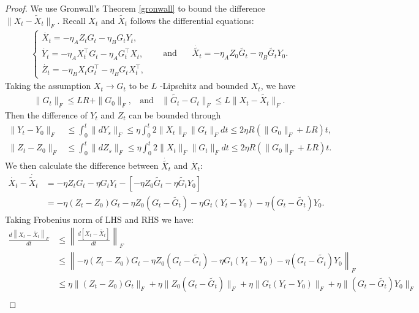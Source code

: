 \begin{proof}
    We use Gronwall's Theorem \ref{gronwall} to bound the difference $\|X_t-\tilde{X}_t\|_F$. Recall $X_t$ and $\tilde{X_t}$ follows the differential equations:
    \begin{align}
        \begin{cases}
            \dot{X_t}=-\eta_A Z_tG_t-\eta_B G_tY_t,\\
            \dot{Y_t}=-\eta_A X_t^\top G_t-\eta_A G_t^\top X_t,\\
            \dot{Z_t}=-\eta_B X_tG_t^\top -\eta_B G_tX_t^\top,
        \end{cases}
        ~~~~~~~~\text{and}~~~~~~~~
        \dot{\tilde{X_t}}=-\eta_A Z_0\tilde{G_t}-\eta_B \tilde{G_t}Y_0.
    \end{align}
    Taking the assumption $X_t\to G_t$ to be $L$ -Lipschitz and bounded $X_t$, we have 
    \begin{align}
        \|G_t\|_F\leq LR+\|G_0\|_F,~~~~\text{and}~~~~\|\tilde{G_t}-G_t\|_F\leq L\|X_t-\tilde{X_t}\|_F.
    \end{align}
    Then the difference of $Y_t$ and $Z_t$ can be bounded through
    \begin{align}
        \|Y_t-Y_0\|_F&\leq \int_0^t\|dY_s\|_F\leq \eta \int_0^t 2\|X_t\|_F\|G_t\|_Fdt\leq 2\eta R(\|G_0\|_F+LR)t,\\
        \|Z_t-Z_0\|_F&\leq \int_0^t\|dZ_s\|_F\leq \eta \int_0^t 2\|X_t\|_F\|G_t\|_Fdt\leq 2\eta R(\|G_0\|_F+LR)t.
    \end{align}
    We then calculate the difference between $\dot{\tilde{X_t}}$ and $\dot{X_t}$:
    \begin{align}
        \dot{X_t}-\dot{\tilde{X}_t}&=-\eta Z_tG_t-\eta G_tY_t-[-\eta Z_0\tilde{G_t}-\eta \tilde{G_t}Y_0]\\
        &=-\eta(Z_t-Z_0)G_t-\eta Z_0(G_t-\tilde{G_t})-\eta G_t(Y_t-Y_0)-\eta(G_t-\tilde{G_t})Y_0.
    \end{align}
    Taking Frobenius norm of LHS and RHS we have:
    \begin{align}
        \frac{d\left\|X_t-\tilde{X_t}\right\|_F}{dt}&\leq \left\|\frac{d[X_t-\tilde{X_t}]}{dt}\right\|_F\\
        &\leq \left\|-\eta(Z_t-Z_0)G_t-\eta Z_0(G_t-\tilde{G_t})-\eta G_t(Y_t-Y_0)-\eta(G_t-\tilde{G_t})Y_0\right\|_F\\
        &\leq \eta \|(Z_t-Z_0)G_t\|_F +\eta\|Z_0(G_t-\tilde{G_t})\|_F+\eta \|G_t(Y_t-Y_0)\|_F+\eta \|(G_t-\tilde{G_t})Y_0\|_F\\

\end{align}
\end{proof}
